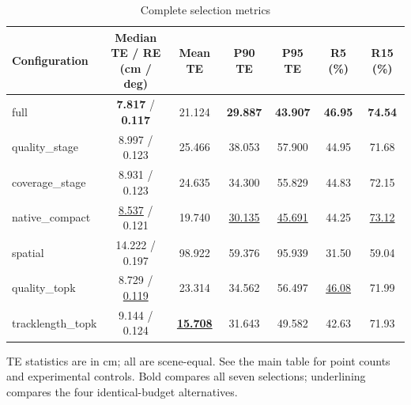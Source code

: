 \begin{table}[tp]
\centering
\footnotesize
\setlength{\tabcolsep}{4pt}
\renewcommand{\arraystretch}{1.12}
\caption{Complete selection metrics}
\label{tab:s_selection}
\begin{tabular}{lcccccc}
\toprule
Configuration & \shortstack{Median TE / RE\\(cm / deg)} & Mean TE & P90 TE & P95 TE & R5 (\%) & R15 (\%) \\
\midrule
full & \textbf{7.817} / \textbf{0.117} & 21.124 & \textbf{29.887} & \textbf{43.907} & \textbf{46.95} & \textbf{74.54} \\
quality\_stage & 8.997 / 0.123 & 25.466 & 38.053 & 57.900 & 44.95 & 71.68 \\
coverage\_stage & 8.931 / 0.123 & 24.635 & 34.300 & 55.829 & 44.83 & 72.15 \\
native\_compact & \underline{8.537} / 0.121 & 19.740 & \underline{30.135} & \underline{45.691} & 44.25 & \underline{73.12} \\
spatial & 14.222 / 0.197 & 98.922 & 59.376 & 95.939 & 31.50 & 59.04 \\
quality\_topk & 8.729 / \underline{0.119} & 23.314 & 34.562 & 56.497 & \underline{46.08} & 71.99 \\
tracklength\_topk & 9.144 / 0.124 & \textbf{\underline{15.708}} & 31.643 & 49.582 & 42.63 & 71.93 \\
\bottomrule
\end{tabular}
\par\smallskip\begin{minipage}{0.98\linewidth}\footnotesize TE statistics are in cm; all are scene-equal. See the main table for point counts and experimental controls. Bold compares all seven selections; underlining compares the four identical-budget alternatives.\end{minipage}
\end{table}
